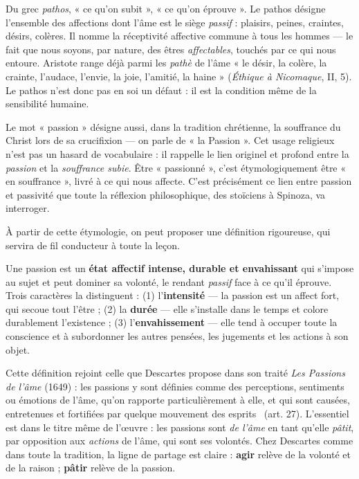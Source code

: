 \documentclass[11pt]{article}
\newcommand{\cle}[1]{{\popxbold\color{popdark}#1}}
\newcounter{popsec}
\newcounter{popsub}
\newcommand{\courssub}[1]{%
  \stepcounter{popsub}%
  \par\vspace{9pt}\noindent{\popxbold\fontsize{11.5}{13}\selectfont\color{popink}{\color{poporange}\thepopsec.\thepopsub}\hspace{6pt}#1}\par\nopagebreak\vspace{4pt}
}
\begin{document}
\begin{definition}[Le pathos]
Du grec \emph{pathos}, « ce qu'on subit », « ce qu'on éprouve ». Le pathos désigne l'ensemble des affections dont l'âme est le siège \emph{passif} : plaisirs, peines, craintes, désirs, colères. Il nomme la \cle{réceptivité affective} commune à tous les hommes — le fait que nous soyons, par nature, des êtres \emph{affectables}, touchés par ce qui nous entoure. Aristote range déjà parmi les \emph{pathè} de l'âme « le désir, la colère, la crainte, l'audace, l'envie, la joie, l'amitié, la haine » (\emph{Éthique à Nicomaque}, II, 5). Le pathos n'est donc pas en soi un défaut : il est la condition même de la sensibilité humaine.
\end{definition}

\begin{savaistu}
Le mot « passion » désigne aussi, dans la tradition chrétienne, la souffrance du Christ lors de sa crucifixion — on parle de « la Passion ». Cet usage religieux n'est pas un hasard de vocabulaire : il rappelle le lien originel et profond entre la \emph{passion} et la \emph{souffrance subie}. Être « passionné », c'est étymologiquement être « en souffrance », livré à ce qui nous affecte. C'est précisément ce lien entre passion et passivité que toute la réflexion philosophique, des stoïciens à Spinoza, va interroger.
\end{savaistu}

\courssub{Définition générale de la passion}

À partir de cette étymologie, on peut proposer une définition rigoureuse, qui servira de fil conducteur à toute la leçon.

\begin{definition}[La passion]
Une \cle{passion} est un \textbf{état affectif intense, durable et envahissant} qui s'impose au sujet et peut dominer sa volonté, le rendant \emph{passif} face à ce qu'il éprouve. Trois caractères la distinguent : (1) l'\textbf{intensité} — la passion est un affect fort, qui secoue tout l'être ; (2) la \textbf{durée} — elle s'installe dans le temps et colore durablement l'existence ; (3) l'\textbf{envahissement} — elle tend à occuper toute la conscience et à subordonner les autres pensées, les jugements et les actions à son objet.
\end{definition}

Cette définition rejoint celle que Descartes propose dans son traité \emph{Les Passions de l'âme} (1649) : les passions y sont définies comme des \guillemotleft perceptions, sentiments ou émotions de l'âme, qu'on rapporte particulièrement à elle, et qui sont causées, entretenues et fortifiées par quelque mouvement des esprits \guillemotright\ (art. 27). L'essentiel est dans le titre même de l'œuvre : les passions sont \emph{de l'âme} en tant qu'elle \emph{pâtit}, par opposition aux \emph{actions} de l'âme, qui sont ses volontés. Chez Descartes comme dans toute la tradition, la ligne de partage est claire : \textbf{agir} relève de la volonté et de la raison ; \textbf{pâtir} relève de la passion.
\end{document}
